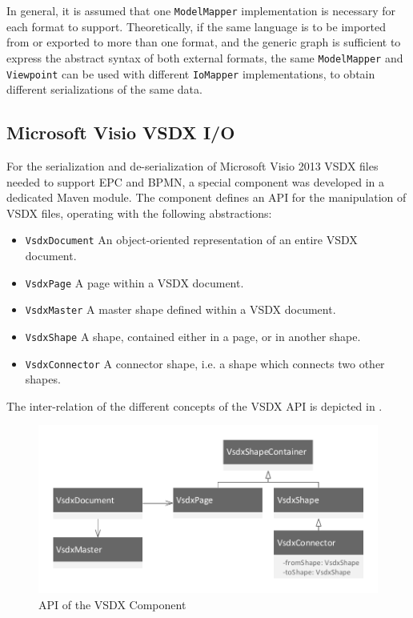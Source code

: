 In general, it is assumed that one \texttt{ModelMapper} implementation is necessary for each format to support. Theoretically, if the same language is to be imported from or exported to more than one format, and the generic graph is sufficient to express the abstract syntax of both external formats, the same \texttt{ModelMapper} and \texttt{Viewpoint} can be used with different \texttt{IoMapper} implementations, to obtain different serializations of the same data.

\subsection{Microsoft Visio VSDX I/O}

For the serialization and de-serialization of Microsoft Visio 2013 VSDX files needed to support EPC and BPMN, a special component was developed in a dedicated Maven module. The component defines an API for the manipulation of VSDX files, operating with the following abstractions:

\begin{itemize}
\item \texttt{VsdxDocument} An object-oriented representation of an entire VSDX document.
\item \texttt{VsdxPage} A page within a VSDX document.
\item \texttt{VsdxMaster} A master shape defined within a VSDX document.
\item \texttt{VsdxShape} A shape, contained either in a page, or in another shape.
\item \texttt{VsdxConnector} A connector shape, i.e. a shape which connects two other shapes.
\end{itemize}

The inter-relation of the different concepts of the VSDX API is depicted in .

\begin{figure}[h]
\centering
\includegraphics[scale=0.75]{figures/visio.pdf}
\caption{API of the VSDX Component}
\label{fig:vsdxapi}
\end{figure}

